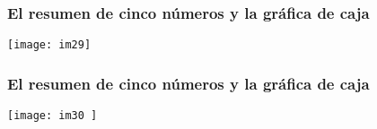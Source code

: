 \documentclass[spanish]{beamer}
\begin{document}
\begin{frame}
\frametitle{El resumen de cinco números y la gráfica de caja}


\begin{center}
\texttt{[image: im29]}
\end{center}

\end{frame}
\begin{frame}
\frametitle{El resumen de cinco números y la gráfica de caja}


\begin{center}
\texttt{[image: im30
]}
\end{center}

\end{frame}
\end{document}
